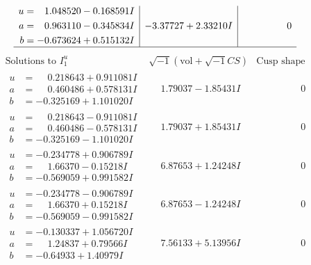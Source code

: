 \documentclass[1p]{elsarticle_modified}
\theoremstyle{definition}
\newcommand{\I}{\sqrt{-1}}
\begin{document}
$$\begin{array}{c|c|c}
\begin{aligned}
u &= \phantom{-}1.048520 - 0.168591 I \\
a &= \phantom{-}0.963110 - 0.345834 I \\
b &= -0.673624 + 0.515132 I\end{aligned}
 & -3.37727 + 2.33210 I & \phantom{-0.000000 } 0\\
 \hline 
 \end{array}$$\newpage$$\begin{array}{c|c|c}  
\text{Solutions to }I^u_{1}& \I (\text{vol} + \sqrt{-1}CS) & \text{Cusp shape}\\
 \hline 
\begin{aligned}
u &= \phantom{-}0.218643 + 0.911081 I \\
a &= \phantom{-}0.460486 + 0.578131 I \\
b &= -0.325169 + 1.101020 I\end{aligned}
 & \phantom{-}1.79037 - 1.85431 I & \phantom{-0.000000 } 0 \\ \hline\begin{aligned}
u &= \phantom{-}0.218643 - 0.911081 I \\
a &= \phantom{-}0.460486 - 0.578131 I \\
b &= -0.325169 - 1.101020 I\end{aligned}
 & \phantom{-}1.79037 + 1.85431 I & \phantom{-0.000000 } 0 \\ \hline\begin{aligned}
u &= -0.234778 + 0.906789 I \\
a &= \phantom{-}1.66370 - 0.15218 I \\
b &= -0.569059 + 0.991582 I\end{aligned}
 & \phantom{-}6.87653 + 1.24248 I & \phantom{-0.000000 } 0 \\ \hline\begin{aligned}
u &= -0.234778 - 0.906789 I \\
a &= \phantom{-}1.66370 + 0.15218 I \\
b &= -0.569059 - 0.991582 I\end{aligned}
 & \phantom{-}6.87653 - 1.24248 I & \phantom{-0.000000 } 0 \\ \hline\begin{aligned}
u &= -0.130337 + 1.056720 I \\
a &= \phantom{-}1.24837 + 0.79566 I \\
b &= -0.64933 + 1.40979 I\end{aligned}
 & \phantom{-}7.56133 + 5.13956 I & \phantom{-0.000000 } 0 \\ \hline\begin{aligned}

\end{aligned}
\end{array}$$
\end{document}
